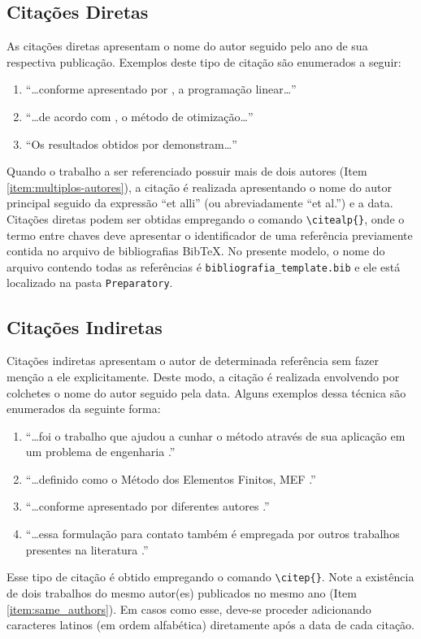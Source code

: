 \subsection{Citações Diretas}
As citações diretas apresentam o nome do autor seguido pelo ano de sua respectiva publicação. Exemplos deste tipo de citação são enumerados a seguir:
\begin{enumerate}[label={\roman*.},ref={\roman*}]
	\item ``\ldots conforme apresentado por \citealp{dantzig1963linear}, a programação linear\ldots''
	\item ``\ldots de acordo com \citealp{haftka1991elements}, o método de otimização\ldots''
	\item ``Os resultados obtidos por \citealp{deleon2015stress} demonstram\ldots''\label{item:multiplos-autores}
\end{enumerate}
Quando o trabalho a ser referenciado possuir mais de dois autores (Item \ref{item:multiplos-autores}), a citação é realizada apresentando o nome do autor principal seguido da expressão “et alli” (ou abreviadamente “et al.”) e a data. Citações diretas podem ser obtidas empregando o comando \lstinline!\citealp{}!, onde o termo entre chaves deve apresentar o identificador de uma referência previamente contida no arquivo de bibliografias Bib\TeX. No presente modelo, o nome do arquivo contendo todas as referências é \texttt{bibliografia{\_}template.bib} e ele está localizado na pasta \texttt{Preparatory}. 

\subsection{Citações Indiretas}
Citações indiretas apresentam o autor de determinada referência sem fazer menção a ele explicitamente. Deste modo, a citação é realizada envolvendo por colchetes o nome do autor seguido pela data. Alguns exemplos dessa técnica são enumerados da seguinte forma:
\begin{enumerate}[label={\roman*.},ref={\roman*}]
	\item ``\ldots foi o trabalho que ajudou a cunhar o método através de sua aplicação em um problema de engenharia \citep{bathe1996finite}.''
	\item ``\ldots definido como o Método dos Elementos Finitos, MEF \citep{hughes2012finite}.''
	\item ``\ldots conforme apresentado por diferentes autores \citep{reddy2006introduction, zienkiewicz2005finite, bathe1996finite}.''
	\item ``\ldots essa formulação para contato \citep{man1993incremental} também é empregada por outros trabalhos presentes na literatura \citep{man1993engineering}.''\label{item:same_authors}
\end{enumerate}
Esse tipo de citação é obtido empregando o comando \lstinline!\citep{}!. Note a existência de dois trabalhos do mesmo autor(es) publicados no mesmo ano (Item \ref{item:same_authors}). Em casos como esse, deve-se proceder adicionando caracteres latinos (em ordem alfabética) diretamente após a data de cada citação. 

